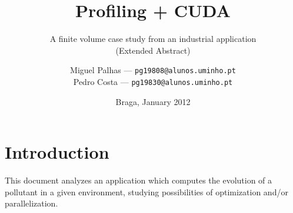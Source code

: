 \documentclass[9pt,twocolumn]{scrartcl}
\title{Profiling + CUDA}
\subtitle{A finite volume case study from an industrial application\\(Extended Abstract)}%
\author{Miguel Palhas \hfill--- \texttt{\smaller pg19808@alunos.uminho.pt}\\Pedro Costa \hfill--- \texttt{\smaller pg19830@alunos.uminho.pt}}
\date{Braga, January 2012}
\begin{document}
\maketitle

\section{Introduction}









This document analyzes an application which computes the evolution of a pollutant in a given environment, studying possibilities of optimization and/or parallelization.
\end{document}
